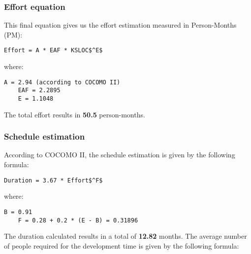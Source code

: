\subsubsection{Effort equation}

This final equation gives us the effort estimation measured in Person-Months (PM):

\vspace{1em}

\begin{lstlisting}[stepnumber=0, frame=single,mathescape]
	Effort = A * EAF * KSLOC$^E$
\end{lstlisting}

 \vspace{1em}

where:

\vspace{1em}

\begin{lstlisting}[stepnumber=0, frame=single,mathescape]
	A = 2.94 (according to COCOMO II) 
	EAF = 2.2895 
	E = 1.1048
\end{lstlisting}

The total effort results in \textbf{50.5} person-months.

\subsubsection{Schedule estimation}

According to COCOMO II, the schedule estimation is given by the following formula:

 \vspace{1em}

\begin{lstlisting}[stepnumber=0, frame=single,mathescape]
	Duration = 3.67 * Effort$^F$
\end{lstlisting}

 \vspace{1em}

where:

\vspace{1em}

\begin{lstlisting}[stepnumber=0, frame=single,mathescape]
	B = 0.91
	F = 0.28 + 0.2 * (E - B) = 0.31896
\end{lstlisting}

 \vspace{1em}

The duration calculated results in a total of \textbf{12.82} months. The average number of people required for the development time is given by the following formula:


